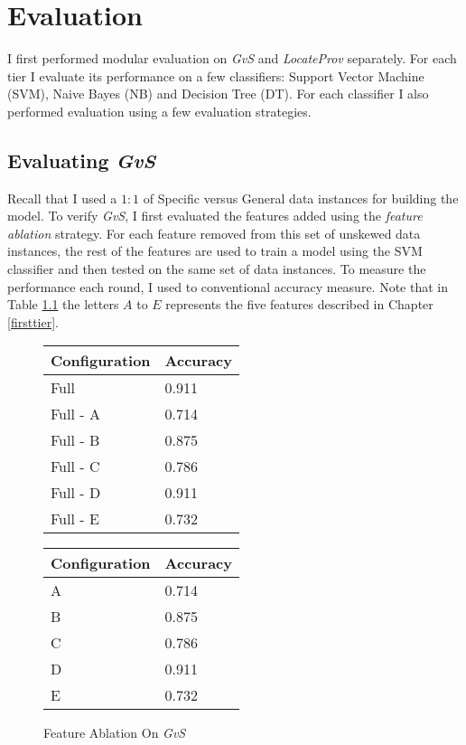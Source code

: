\chapter{Evaluation}
\label{evaluation}
I first performed modular evaluation on {\it GvS} and {\it LocateProv} separately. For each tier I evaluate its performance on a few classifiers: Support Vector Machine (SVM), Naive Bayes (NB) and Decision Tree (DT). For each classifier I also performed evaluation using a few evaluation strategies.

\section{Evaluating {\it GvS}}
Recall that I used a $1:1$ of Specific versus General data instances for building the model. To verify {\it GvS}, I first evaluated the features added using the {\it feature ablation} strategy. For each feature removed from this set of unskewed data instances, the rest of the features are used to train a model using the SVM classifier and then tested on the same set of data instances. To measure the performance each round, I used to conventional accuracy measure. Note that in Table \ref{tab:ablation_first} the letters $A$ to $E$ represents the five features described in Chapter \ref{firsttier}.

\begin{figure}[ht]
\begin{minipage}[b]{0.45\linewidth}\centering
\begin{tabular}{| l | l |}
Configuration & Accuracy \\
\hline
Full		& 0.911 \\
Full - A	& 0.714 \\
Full - B	& 0.875 \\
Full - C	& 0.786 \\
Full - D	& 0.911 \\
Full - E	& 0.732 \\
\end{tabular}
\end{minipage}
\hspace{0.5cm}
\begin{minipage}[b]{0.45\linewidth}\centering
\begin{tabular}{ l | l }
Configuration & Accuracy \\
\hline
A	& 0.714 \\
B	& 0.875 \\
C	& 0.786 \\
D	& 0.911 \\
E	& 0.732 \\
\end{tabular}
\end{minipage}
\caption{Feature Ablation On {\it GvS}}
\label{tab:ablation_first}
\end{figure}

